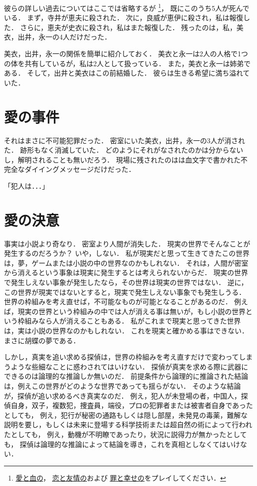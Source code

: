 彼らの詳しい過去についてはここでは省略するが
\footnote{\href{http://jumpaku.hatenablog.com/entry/2016/04/14/002437}{\underline{愛と血の}}，
\href{http://jumpaku.hatenablog.com/entry/2016/07/24/032632}{\underline{恋と友情の}}および
\href{http://jumpaku.hatenablog.com/entry/2017/07/24/044918}{\underline{罪と幸せの}}をプレイしてください．}，
既にこのうち5人が死んでいる．
まず，寺井が恵夫に殺された．
次に，良威が恵伊に殺され，私は報復した．
さらに，恵夫が史衣に殺され，私はまた報復した．
残ったのは，私，美衣，出井，永一の4人だけだった．

美衣，出井，永一の関係を簡単に紹介しておく．
美衣と永一は2人の人格で1つの体を共有しているが，私は2人として扱っている．
また，美衣と永一は姉弟である．
そして，出井と美衣はこの前結婚した．
彼らは生きる希望に満ち溢れていた．

\section{愛の事件}
それはまさに不可能犯罪だった．
密室にいた美衣，出井，永一の3人が消された．
跡形もなく消滅していた．
どのようにそれがなされたのかは分からないし，解明されることも無いだろう．
現場に残されたのはは血文字で書かれた不完全なダイイングメッセージだけだった．

「犯人は．．．」

\section{愛の決意}
事実は小説より奇なり．
密室より人間が消失した．
現実の世界でそんなことが発生するのだろうか？
いや，しない．
私が現実だと思って生きてきたこの世界は，夢，ゲームまたは小説の中の世界なのかもしれない．
それは，人間が密室から消えるという事象は現実に発生するとは考えられないからだ．
現実の世界で発生しえない事象が発生したなら，その世界は現実の世界ではない．
逆に，この世界が現実ではないとすると，現実で発生しえない事象でも発生しうる．
世界の枠組みを考え直せば，不可能なものが可能となることがあるのだ．
例えば，現実の世界という枠組みの中では人が消える事は無いが，もし小説の世界という枠組みなら人が消えることもある．
私がこれまで現実と思ってきた世界は，実は小説の世界なのかもしれない．
これを現実と確かめる事はできない．
まさに胡蝶の夢である．

しかし，真実を追い求める探偵は，世界の枠組みを考え直すだけで変わってしまうような些細なことに惑わされてはいけない．
探偵が真実を求める際に武器にできるのは論理的な推論しか無いのだ．
前提条件から論理的に推論された結論は，例えこの世界がどのような世界であっても揺らがない．
そのような結論が，探偵が追い求めるべき真実なのだ．
例え，犯人が未登場の者，中国人，探偵自身，双子，複数犯，捜査員，端役，プロの犯罪者または被害者自身であったとしても，
例え，犯行が秘密の通路もしくは隠し部屋，未発見の毒薬，難解な説明を要し，もしくは未来に登場する科学技術または超自然の術によって行われたとしても，
例え，動機が不明瞭であったり，状況に説得力が無かったとしても，
探偵は論理的な推論によって結論を導き，これを真相としなくてはいけない．

